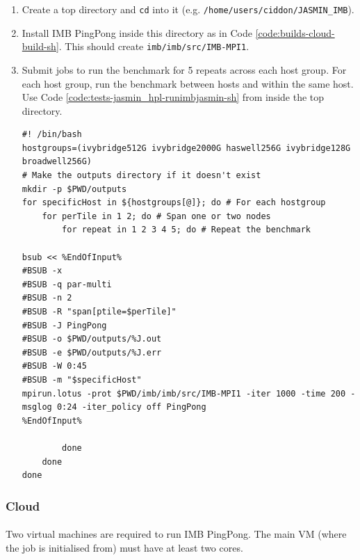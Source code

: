\documentclass{article}
\newenvironment{code}{\captionsetup{type=listing}}{}
\begin{document}
            \begin{enumerate}
                \item Create a top directory and \verb|cd| into it (e.g. \verb|/home/users/ciddon/JASMIN_IMB|).
                \item Install IMB PingPong inside this directory as in Code \ref{code:builds-cloud-build-sh}. This should create \verb|imb/imb/src/IMB-MPI1|.
                \item Submit jobs to run the benchmark for 5 repeats across each host group. For each host group, run the benchmark between hosts and within the same host. Use Code \ref{code:tests-jasmin_hpl-runimbjasmin-sh} from inside the top directory.

                    \begin{code}
                    \label{code:tests-jasmin_hpl-runimbjasmin-sh}
                    \begin{verbatim}
#! /bin/bash
hostgroups=(ivybridge512G ivybridge2000G haswell256G ivybridge128G broadwell256G)
# Make the outputs directory if it doesn't exist
mkdir -p $PWD/outputs
for specificHost in ${hostgroups[@]}; do # For each hostgroup
    for perTile in 1 2; do # Span one or two nodes
        for repeat in 1 2 3 4 5; do # Repeat the benchmark

bsub << %EndOfInput%
#BSUB -x
#BSUB -q par-multi
#BSUB -n 2
#BSUB -R "span[ptile=$perTile]"
#BSUB -J PingPong
#BSUB -o $PWD/outputs/%J.out
#BSUB -e $PWD/outputs/%J.err
#BSUB -W 0:45
#BSUB -m "$specificHost"
mpirun.lotus -prot $PWD/imb/imb/src/IMB-MPI1 -iter 1000 -time 200 -msglog 0:24 -iter_policy off PingPong
%EndOfInput%

        done
    done
done
                    \end{verbatim}
                    \end{code}
            \end{enumerate}
        \subsubsection{Cloud}

            \paragraph{}
            Two virtual machines are required to run IMB PingPong. The main VM (where the job is initialised from) must have at least two cores.
\end{document}

